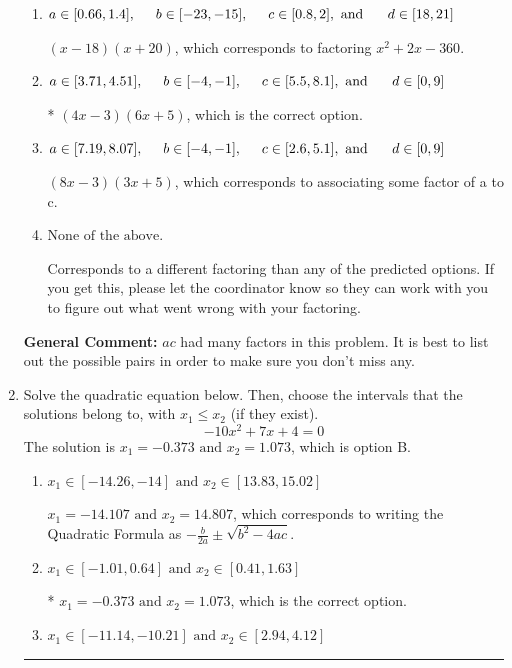 \documentclass{extbook}[14pt]
\newcommand{\litem}[1]{\item #1

\rule{\textwidth}{0.4pt}}
\begin{document}
\begin{enumerate}
{\begin{enumerate}[label=\Alph*.]
 $(2x -3)(12x + 5)$, which corresponds to associating some factor of c to a.
\item \( a \in [0.66, 1.4], \hspace*{5mm} b \in [-23, -15], \hspace*{5mm} c \in [0.8, 2], \text{ and } \hspace*{5mm} d \in [18, 21] \)

 $(x -18)(x + 20)$, which corresponds to factoring $x^{2} +2 x -360$.
\item \( a \in [3.71, 4.51], \hspace*{5mm} b \in [-4, -1], \hspace*{5mm} c \in [5.5, 8.1], \text{ and } \hspace*{5mm} d \in [0, 9] \)

* $(4x -3)(6x + 5)$, which is the correct option.
\item \( a \in [7.19, 8.07], \hspace*{5mm} b \in [-4, -1], \hspace*{5mm} c \in [2.6, 5.1], \text{ and } \hspace*{5mm} d \in [0, 9] \)

 $(8x -3)(3x + 5)$, which corresponds to associating some factor of a to c.
\item \( \text{None of the above.} \)

 Corresponds to a different factoring than any of the predicted options. If you get this, please let the coordinator know so they can work with you to figure out what went wrong with your factoring.
\end{enumerate}

\textbf{General Comment:} $ac$ had many factors in this problem. It is best to list out the possible pairs in order to make sure you don't miss any.
}
\litem{
Solve the quadratic equation below. Then, choose the intervals that the solutions belong to, with $x_1 \leq x_2$ (if they exist).
\[ -10x^{2} +7 x + 4 = 0 \]
The solution is \( x_1 = -0.373 \text{ and } x_2 = 1.073 \), which is option B.\begin{enumerate}[label=\Alph*.]
\item \( x_1 \in [-14.26, -14] \text{ and } x_2 \in [13.83, 15.02] \)

 $x_1 = -14.107 \text{ and } x_2 = 14.807$, which corresponds to writing the Quadratic Formula as $-\frac{b}{2a} \pm \sqrt{b^2 - 4ac}$.
\item \( x_1 \in [-1.01, 0.64] \text{ and } x_2 \in [0.41, 1.63] \)

* $x_1 = -0.373 \text{ and } x_2 = 1.073$, which is the correct option.
\item \( x_1 \in [-11.14, -10.21] \text{ and } x_2 \in [2.94, 4.12] \)


\end{enumerate}}
\end{enumerate}
\end{document}

